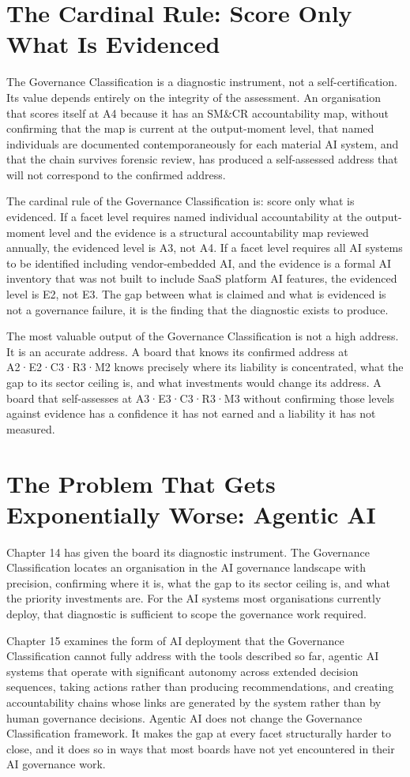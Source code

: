 \section{The Cardinal Rule: Score Only What Is Evidenced}

The Governance Classification is a diagnostic instrument, not a self-certification. Its value depends entirely on the integrity of the assessment. An organisation that scores itself at A4 because it has an SM\&CR accountability map, without confirming that the map is current at the output-moment level, that named individuals are documented contemporaneously for each material AI system, and that the chain survives forensic review, has produced a self-assessed address that will not correspond to the confirmed address.

The cardinal rule of the Governance Classification is: score only what is evidenced. If a facet level requires named individual accountability at the output-moment level and the evidence is a structural accountability map reviewed annually, the evidenced level is A3, not A4. If a facet level requires all AI systems to be identified including vendor-embedded AI, and the evidence is a formal AI inventory that was not built to include SaaS platform AI features, the evidenced level is E2, not E3. The gap between what is claimed and what is evidenced is not a governance failure, it is the finding that the diagnostic exists to produce.

The most valuable output of the Governance Classification is not a high address. It is an accurate address. A board that knows its confirmed address at A2·E2·C3·R3·M2 knows precisely where its liability is concentrated, what the gap to its sector ceiling is, and what investments would change its address. A board that self-assesses at A3·E3·C3·R3·M3 without confirming those levels against evidence has a confidence it has not earned and a liability it has not measured.

\scenebreak

\section{The Problem That Gets Exponentially Worse: Agentic AI}

Chapter 14 has given the board its diagnostic instrument. The Governance Classification locates an organisation in the AI governance landscape with precision, confirming where it is, what the gap to its sector ceiling is, and what the priority investments are. For the AI systems most organisations currently deploy, that diagnostic is sufficient to scope the governance work required.

Chapter 15 examines the form of AI deployment that the Governance Classification cannot fully address with the tools described so far, agentic AI systems that operate with significant autonomy across extended decision sequences, taking actions rather than producing recommendations, and creating accountability chains whose links are generated by the system rather than by human governance decisions. Agentic AI does not change the Governance Classification framework. It makes the gap at every facet structurally harder to close, and it does so in ways that most boards have not yet encountered in their AI governance work.
